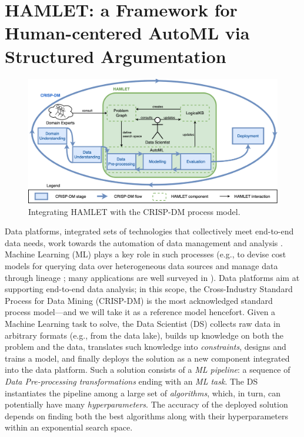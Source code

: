 \chapter{HAMLET: a Framework for Human-centered AutoML via Structured Argumentation}
\label{human-centric-chap:hamlet}

\begin{figure}[t]
    \centering
    \includegraphics[scale=.3]{chapters/human-centric/hamlet/img/dymmymodel.png}
    \caption{Integrating HAMLET with the CRISP-DM process model.}
    \label{hamlet-fig:approach}
\end{figure}

Data platforms, integrated sets of technologies that collectively meet end-to-end data needs, work towards the automation of data management and analysis \cite{DBLP:journals/fgcs/FranciaGGLRS21}.
Machine Learning (ML) plays a key role in such processes (e.g., to devise cost models for querying data over heterogeneous data sources \cite{multi-store} and manage data through lineage \cite{dataplat2}; many applications are well surveyed in \cite{zhou2017ml}).
Data platforms aim at supporting end-to-end data analysis; in this scope, the Cross-Industry Standard Process for Data Mining (CRISP-DM) \cite{wirth2000crisp} is the most acknowledged standard process model---and we will take it as a reference model hencefort.
Given a Machine Learning task to solve, the Data Scientist (DS) collects raw data in arbitrary formats (e.g., from the data lake), builds up knowledge on both the problem and the data, translates such knowledge into \emph{constraints}, designs and trains a model, and finally deploys the solution as a new component integrated into the data platform.
Such a solution consists of a \emph{ML pipeline}: a sequence of \emph{Data Pre-processing transformations} ending with an \emph{ML task}.
The DS instantiates the pipeline among a large set of \emph{algorithms}, which, in turn, can potentially have many \emph{hyperparameters}.
The accuracy of the deployed solution depends on finding both the best algorithms along with their hyperparameters within an exponential search space.

